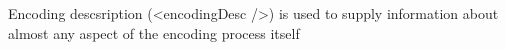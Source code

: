  Encoding descsription (<encodingDesc />) is used to supply information about almost any aspect of the encoding process itself







